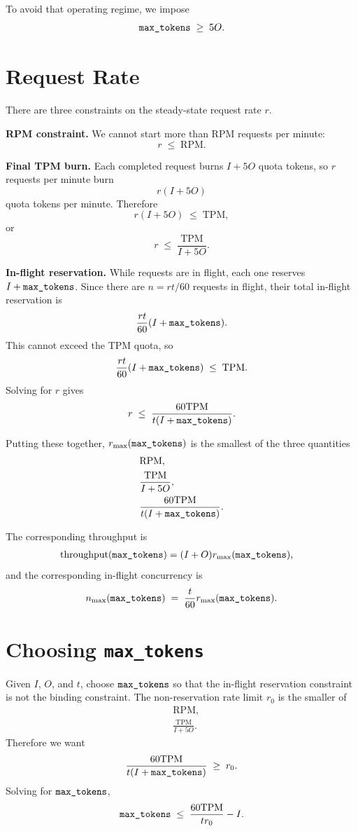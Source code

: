 \documentclass[12pt]{extarticle}
\newcommand{\maxtok}{\text{\texttt{max\_tokens}}}
\newcommand{\inputtokens}{I}
\newcommand{\outputtokens}{O}
\newcommand{\TPM}{\text{TPM}}
\newcommand{\RPM}{\text{RPM}}
\begin{document}
To avoid that operating regime, we impose
\[
\maxtok \;\geq\; 5\outputtokens.
\]

\section{Request Rate}

There are three constraints on the steady-state request rate $r$.

\textbf{RPM constraint.} We cannot start more than $\RPM$ requests per minute:
\[
r \;\leq\; \RPM.
\]

\textbf{Final TPM burn.} Each completed request burns $\inputtokens + 5\outputtokens$ quota tokens, so $r$ requests per minute burn
\[
r(\inputtokens + 5\outputtokens)
\]
quota tokens per minute. Therefore
\[
r(\inputtokens + 5\outputtokens) \;\leq\; \TPM,
\]
or
\[
r \;\leq\; \frac{\TPM}{\inputtokens + 5\outputtokens}.
\]

\textbf{In-flight reservation.} While requests are in flight, each one reserves $\inputtokens + \maxtok$. Since there are $n = rt/60$ requests in flight, their total in-flight reservation is
\[
\frac{rt}{60}(\inputtokens + \maxtok).
\]
This cannot exceed the TPM quota, so
\[
\frac{rt}{60}(\inputtokens + \maxtok) \;\leq\; \TPM.
\]
Solving for $r$ gives
\[
r \;\leq\; \frac{60\TPM}{t(\inputtokens + \maxtok)}.
\]

Putting these together, $r_{\max}(\maxtok)$ is the smallest of the three quantities
\[
\begin{aligned}
&\RPM,\\
&\frac{\TPM}{\inputtokens + 5\outputtokens},\\
&\frac{60\TPM}{t(\inputtokens + \maxtok)}.
\end{aligned}
\]

The corresponding throughput is
\[
\begin{aligned}
\text{throughput}(\maxtok)
&= (\inputtokens + \outputtokens) r_{\max}(\maxtok),
\end{aligned}
\]
and the corresponding in-flight concurrency is
\[
n_{\max}(\maxtok) \;=\; \frac{t}{60}r_{\max}(\maxtok).
\]

\section{Choosing \texttt{max\_tokens}}

Given $\inputtokens$, $\outputtokens$, and $t$, choose $\maxtok$ so that the in-flight reservation constraint is not the binding constraint. The non-reservation rate limit $r_0$ is the smaller of
\[
\begin{aligned}
&\RPM,\\
&\frac{\TPM}{\inputtokens + 5\outputtokens}.
\end{aligned}
\]
Therefore we want
\[
\frac{60\TPM}{t(\inputtokens + \maxtok)} \;\geq\; r_0.
\]
Solving for $\maxtok$,
\[
\maxtok \;\leq\; \frac{60\TPM}{t r_0} - \inputtokens.
\]
\end{document}
